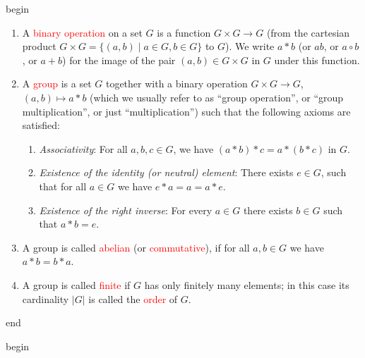 \documentclass[
  12pt,
  a4paper,
  twoside]{article}
\theoremstyle{plain}
\theoremstyle{definition}
\begin{document}
\csname begin\label{cnj:defn-group}

\begin{enumerate}
\def\labelenumi{(\alph{enumi})}
\item
  A \textcolor{red}{binary operation} on a set \(G\) is a function \(G\times G\to G\) (from the cartesian product \(G\times G=\{(a,b)\mid a\in G, b\in G\}\) to \(G\)). We write \(a * b\) (or \(ab\), or \(a\circ b\), or \(a+b\)) for the image of the pair \((a,b)\in G\times G\) in \(G\) under this function.
\item
  A \textcolor{red}{group} is a set \(G\) together with a binary operation \(G\times G\to G\), \((a,b)\mapsto a*b\) (which we usually refer to as ``group operation'', or ``group multiplication'', or just ``multiplication'') such that the following axioms are satisfied:

  \begin{enumerate}
  \def\labelenumii{(\roman{enumii})}
  \item
    \emph{Associativity}: For all \(a,b,c\in G\), we have \((a*b)*c = a*(b*c)\) in \(G\).
  \item
    \emph{Existence of the identity (or neutral) element}: There exists \(e\in G\), such that for all \(a\in G\) we have \(e*a=a=a*e\).
  \item
    \emph{Existence of the right inverse}: For every \(a\in G\) there exists \(b\in G\) such that \(a*b=e\).
  \end{enumerate}
\item
  A group is called \textcolor{red}{abelian} (or \textcolor{red}{commutative}), if for all \(a,b\in G\) we have \(a*b=b*a\).
\item
  A group is called \textcolor{red}{finite} if \(G\) has only finitely many elements; in this case its cardinality \(|G|\) is called the \textcolor{red}{order} of \(G\).
\end{enumerate}

\csname end

\csname begin\label{cnj:expl-groups}
\end{document}

